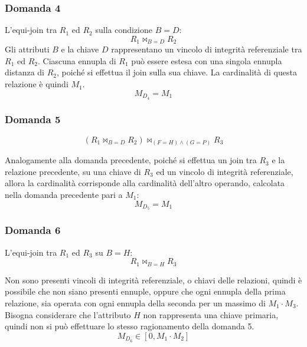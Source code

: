 \documentclass{article}
\numberwithin{equation}{subsection}
\begin{document}
\subsubsection*{Domanda 4}

L'equi-join tra $R_1$ ed $R_2$ sulla condizione $B=D$:
\begin{equation*}
    R_1\Join_{B=D}R_2
\end{equation*}
Gli attributi $B$ e la chiave $D$ rappresentano un vincolo di integrità referenziale tra $R_1$ ed $R_2$. Ciascuna ennupla di $R_1$ può essere estesa con una singola ennupla distanza di $R_2$, 
poiché si effettua il join sulla sua chiave. La cardinalità di questa relazione è quindi $M_1$.  
\begin{equation}
    M_{D_4}=M_1
\end{equation}

\subsubsection*{Domanda 5}

\begin{equation*}
    (R_1\Join_{B=D}R_2)\Join_{(F=H)\land(G=P)}R_3
\end{equation*}

Analogamente alla domanda precedente, poiché si effettua un join tra $R_3$ e la relazione precedente, su una chiave di $R_3$ ed un vincolo di integrità referenziale, allora la cardinalità 
corrisponde alla cardinalità dell'altro operando, calcolata nella domanda precedente pari a $M_1$:
\begin{equation}
    M_{D_5}=M_1
\end{equation}

\subsubsection*{Domanda 6}

L'equi-join tra $R_1$ ed $R_3$ su $B=H$:
\begin{equation*}
    R_1\Join_{B=H}R_3
\end{equation*}

Non sono presenti vincoli di integrità referenziale, o chiavi delle relazioni, quindi è possibile che non siano presenti ennuple, oppure che ogni ennupla della prima relazione, sia operata 
con ogni ennupla della seconda per un massimo di $M_1\cdot M_3$. Bisogna considerare che l'attributo $H$ non rappresenta una chiave primaria, quindi non si può effettuare lo stesso 
ragionamento della domanda 5. 
\begin{equation}
    M_{D_6}\in[0,M_1\cdot M_2]
\end{equation}
\end{document}
